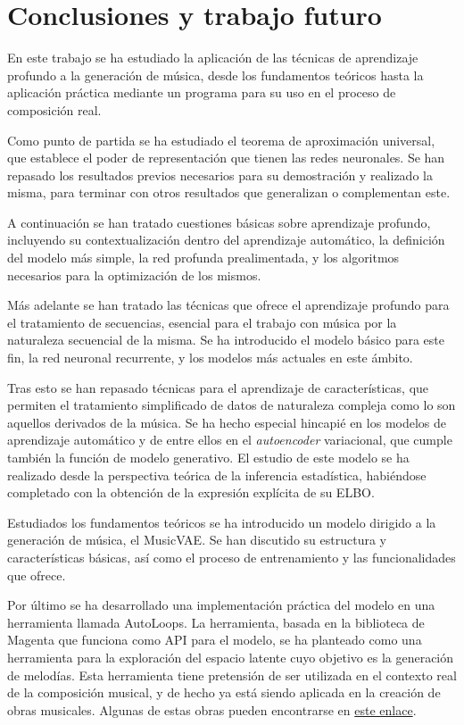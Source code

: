 
\chapter{Conclusiones y trabajo futuro}

En este trabajo se ha estudiado la aplicación de las técnicas de aprendizaje profundo a la generación de música, desde los fundamentos teóricos hasta la aplicación práctica mediante un programa para su uso en el proceso de composición real.

Como punto de partida se ha estudiado el teorema de aproximación universal, que establece el poder de representación que tienen las redes neuronales. Se han repasado los resultados previos necesarios para su demostración y realizado la misma, para terminar con otros resultados que generalizan o complementan este.

A continuación se han tratado cuestiones básicas sobre aprendizaje profundo, incluyendo su contextualización dentro del aprendizaje automático, la definición del modelo más simple, la red profunda prealimentada, y los algoritmos necesarios para la optimización de los mismos.

Más adelante se han tratado las técnicas que ofrece el aprendizaje profundo para el tratamiento de secuencias, esencial para el trabajo con música por la naturaleza secuencial de la misma. Se ha introducido el modelo básico para este fin, la red neuronal recurrente, y los modelos más actuales en este ámbito.

Tras esto se han repasado técnicas para el aprendizaje de características, que permiten el tratamiento simplificado de datos de naturaleza compleja como lo son aquellos derivados de la música. Se ha hecho especial hincapié en los modelos de aprendizaje automático y de entre ellos en el \textit{autoencoder} variacional, que cumple también la función de modelo generativo. El estudio de este modelo se ha realizado desde la perspectiva teórica de la inferencia estadística, habiéndose completado con la obtención de la expresión explícita de su ELBO.

Estudiados los fundamentos teóricos se ha introducido un modelo dirigido a la generación de música, el MusicVAE. Se han discutido su estructura y características básicas, así como el proceso de entrenamiento y las funcionalidades que ofrece.

Por último se ha desarrollado una implementación práctica del modelo en una herramienta llamada AutoLoops. La herramienta, basada en la biblioteca de Magenta que funciona como API para el modelo, se ha planteado como una herramienta para la exploración del espacio latente cuyo objetivo es la generación de melodías. Esta herramienta tiene pretensión de ser utilizada en el contexto real de la composición musical, y de hecho ya está siendo aplicada en la creación de obras musicales. Algunas de estas obras pueden encontrarse en \href{https://soundcloud.com/user-860813847/sets/autoloops}{este enlace}.

